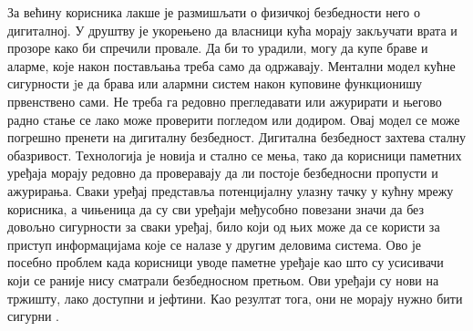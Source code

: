 \documentclass[a4paper]{article}
\begin{document}
За већину корисника лакше је размишљати о физичкој безбедности него о дигиталној. У друштву је укорењено да власници кућа морају закључати
врата и прозоре како би спречили провале. Да би то урадили, могу да купе браве и аларме, које након постављања треба само да одржавају.
Ментални модел кућне сигурности jе да брава или алармни систем након куповине функционишу првенствено сами. Не треба га редовно
прегледавати или ажурирати и његово радно стање се лако може проверити погледом или додиром. Овај модел се може погрешно пренети на дигиталну безбедност.
\newline  \newline
Дигитална безбедност захтева сталну обазривост. Технологија је новија и стално се мења, тако да корисници паметних уређаја морају редовно да
проверавају да ли постоје безбедносни пропусти и ажурирања. Сваки уређај представља потенцијалну улазну тачку у кућну мрежу корисника, а
чињеница да су сви уређаји међусобно повезани значи да без довољно сигурности за сваки уређај, било који од њих може да се користи за приступ
информацијама које се налазе у другим деловима система. Ово је посебно проблем када корисници уводе паметне уређаје као што су усисивачи који се
раније нису сматрали безбедносном претњом. Ови уређаји су нови на тржишту, лако доступни и јефтини. Као резултат тога, они не морају нужно бити сигурни \cite{6}.
\end{document}
